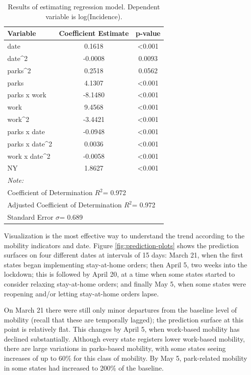 \documentclass[]{elsarticle} %
\begin{document}
\begin{table}[H]

\caption{\label{tab:model-results-log-incidence}\label{tab:model-results}Results of estimating regression model. Dependent variable is log(Incidence).}
\centering
\fontsize{7}{9}\selectfont
\begin{tabular}[t]{lcc}
\toprule
Variable & Coefficient Estimate & p-value\\
\midrule
\rowcolor{gray!6}  date & 0.1618 & <0.001\\
date\textasciicircum{}2 & -0.0008 & 0.0093\\
\rowcolor{gray!6}  parks\textasciicircum{}2 & 0.2518 & 0.0562\\
parks & 4.1307 & <0.001\\
\rowcolor{gray!6}  parks x work & -8.1480 & <0.001\\
\addlinespace
work & 9.4568 & <0.001\\
\rowcolor{gray!6}  work\textasciicircum{}2 & -3.4421 & <0.001\\
parks x date & -0.0948 & <0.001\\
\rowcolor{gray!6}  parks x date\textasciicircum{}2 & 0.0036 & <0.001\\
work x date\textasciicircum{}2 & -0.0058 & <0.001\\
\addlinespace
\rowcolor{gray!6}  NY & 1.8627 & <0.001\\
\bottomrule
\multicolumn{3}{l}{\textit{Note: }}\\
\multicolumn{3}{l}{Coefficient of Determination $R^2$= 0.972}\\
\multicolumn{3}{l}{Adjusted Coefficient of Determination $R^2$= 0.972}\\
\multicolumn{3}{l}{Standard Error $\sigma$= 0.689}\\
\end{tabular}
\end{table}

Visualization is the most effective way to understand the trend
according to the mobility indicators and date. Figure
\ref{fig:prediction-plots} shows the prediction surfaces on four
different dates at intervals of 15 days: March 21, when the first states
began implementing stay-at-home orders; then April 5, two weeks into the
lockdown; this is followed by April 20, at a time when some states
started to consider relaxing stay-at-home orders; and finally May 5,
when some states were reopening and/or letting stay-at-home orders
lapse.

On March 21 there were still only minor departures from the baseline
level of mobility (recall that these are temporally lagged); the
prediction surface at this point is relatively flat. This changes by
April 5, when work-based mobility has declined substantially. Although
every state registers lower work-based mobility, there are large
variations in parks-based mobility, with some states seeing increases of
up to 60\% for this class of mobility. By May 5, park-related mobility
in some states had increased to 200\% of the baseline.
\end{document}
